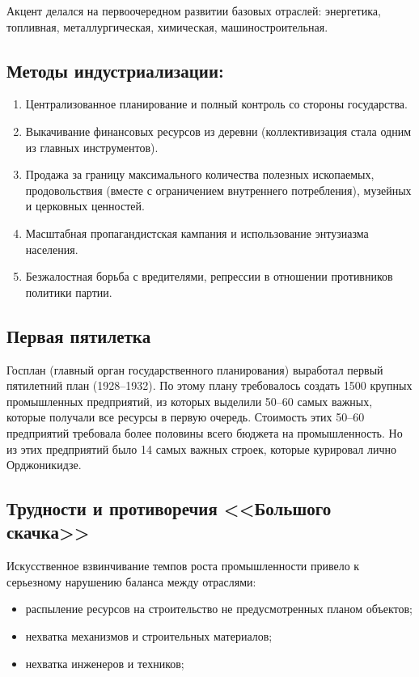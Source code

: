 Акцент делался на первоочередном развитии базовых отраслей: энергетика, топливная, металлургическая, химическая, машиностроительная. 

\subsection{Методы индустриализации:}

\begin{enumerate}
    \item Централизованное планирование и полный контроль со стороны государства.
    \item Выкачивание финансовых ресурсов из деревни (коллективизация стала одним из главных инструментов).
    \item Продажа за границу максимального количества полезных ископаемых, продовольствия (вместе с ограничением внутреннего потребления), музейных и церковных ценностей.
    \item Масштабная пропагандистская кампания и использование энтузиазма населения.
    \item Безжалостная борьба с вредителями, репрессии в отношении противников политики партии.
\end{enumerate}

\subsection{Первая пятилетка}

Госплан (главный орган государственного планирования) выработал первый пятилетний план (1928--1932). По этому плану требовалось создать 1500 крупных промышленных предприятий, из которых выделили 50--60 самых важных, которые получали все ресурсы в первую очередь. Стоимость этих 50--60 предприятий требовала более половины всего бюджета на промышленность. Но из этих предприятий было 14 самых важных строек, которые курировал лично Орджоникидзе.

\subsection{Трудности и противоречия <<Большого скачка>>}

Искусственное взвинчивание темпов роста промышленности привело к серьезному нарушению баланса между отраслями:
\begin{itemize}
    \item распыление ресурсов на строительство не предусмотренных планом объектов;
    \item нехватка механизмов и строительных материалов;
    \item нехватка инженеров и техников;
\end{itemize}

